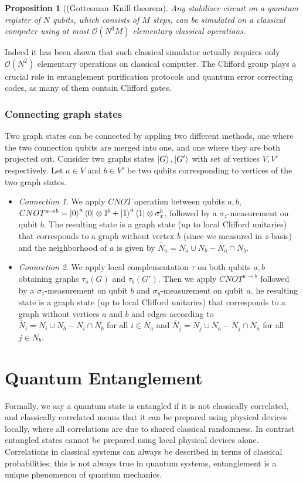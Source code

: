 \documentclass[10pt,a4paper]{book}
\numberwithin{equation}{chapter}
\numberwithin{figure}{chapter}
\numberwithin{table}{chapter}
\newtheorem{prop}{Proposition}[section]
\begin{document}
\begin{prop}[(Gottesman–Knill theorem] Any stabilizer circuit on a quantum register of $N$ qubits, which consists of $M$ steps, can be simulated on a classical computer using at most $\mathcal{O}(N^3 M)$ elementary classical operations.
\end{prop}

Indeed it has been shown that such classical simulator actually requires only $\mathcal{O}(N^2)$ elementary operations on classical computer. The Clifford group plays a crucial role in entanglement purification protocols and quantum error correcting codes, as many of them contain Clifford gates. 

\subsection{Connecting graph states}
Two graph states can be connected by appling two different methods, one where the two connection qubits are merged into one, and one where they are both projected out. Consider two graphs states $\ket{G},\ket{G'}$ with set of vertices $V,V'$ respectively. Let $a \in V$ and $b \in V'$ be two qubits corresponding to vertices of the two graph states.
\begin{itemize}
\item \textit{Connection 1}. We apply $CNOT$ operation between qubits $a,b$, $CNOT^{a\rightarrow b}=\ket{0}^{a}\bra{0}\otimes \mathbb{I}^b + \ket{1}^{a}\bra{1} \otimes \sigma^{b}_x$, followed by a $\sigma_z$-measurement on qubit $b$. The resulting state is a graph state (up to local Clifford unitaries) that corresponds to a graph without vertex $b$ (since we measured in $z$-basis) and the neighborhood of $a$ is given by $\tilde{N_a} = N_a \cup N_b -N_a \cap N_b$.
\item \textit{Connection 2}. We apply local complementation $\tau$ on both qubits $a,b$ obtaining graphs $\tau_a (G)$ and $\tau_b (G')$. Then we apply $CNOT^{a\rightarrow b}$ followed by a $\sigma_z$-measurement on qubit $b$ and $\sigma_y$-measurement on qubit $a$. he resulting state is a graph state (up to local Clifford unitaries) that corresponds to a graph without vertices $a$ and $b$ and edges according to $\tilde{N_i}=N_i\cup N_b -N_i \cap N_b$ for all $i \in N_a$ and $\tilde{N_j}=N_j \cup N_a -N_j \cap N_a$ for all $j \in N_b$.
\end{itemize}

\chapter{Quantum Entanglement}\label{chap:Entanglement}
Formally, we say a quantum state is entangled if it is not classically correlated, and classically correlated means that it can be prepared using physical devices locally, where all correlations are due to shared classical randomness. In contrast entangled states cannot be prepared using local physical devices alone. Correlations in classical systems can always be described in terms of classical probabilities; this is not always true in quantum systems, entanglement is a unique phenomenon of quantum mechanics.
\end{document}
